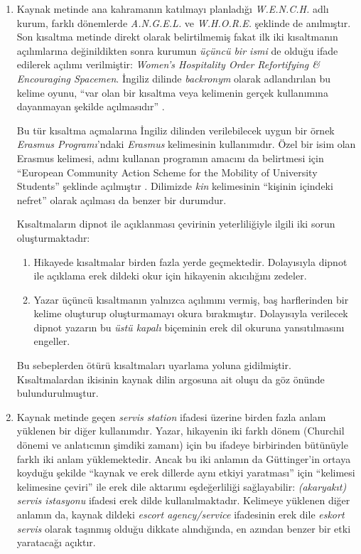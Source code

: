\begin{enumerate}
  \item
    Kaynak metinde ana kahramanın katılmayı planladığı \emph{W.E.N.C.H.} adlı kurum,
    farklı dönemlerde \emph{A.N.G.E.L.} ve \emph{W.H.O.R.E.} şeklinde de anılmıştır.
    Son kısaltma metinde direkt olarak belirtilmemiş fakat ilk iki kısaltmanın
    açılımlarına değinildikten sonra kurumun \emph{üçüncü bir ismi} de olduğu ifade
    edilerek açılımı verilmiştir: \emph{Women's Hospitality Order Refortifying \&
    Encouraging Spacemen}. İngiliz dilinde \emph{backronym} olarak adlandırılan bu
    kelime oyunu, ``var olan bir kısaltma veya kelimenin gerçek kullanımına
    dayanmayan şekilde açılmasıdır'' \citep{OxfordBackronym}.

    Bu tür kısaltma açmalarına İngiliz dilinden verilebilecek uygun bir örnek
    \emph{Erasmus Programı}'ndaki \emph{Erasmus} kelimesinin kullanımıdır. Özel bir
    isim olan Erasmus kelimesi, adını kullanan programın amacını da belirtmesi için
    ``European Community Action Scheme for the Mobility of University Students''
    şeklinde açılmıştır \citep{WkErasmus}. Dilimizde \emph{kin} kelimesinin
    ``kişinin içindeki nefret'' \citep{SesliBackronym} olarak açılması da benzer bir
    durumdur.

    Kısaltmaların dipnot ile açıklanması çevirinin yeterliliğiyle ilgili iki
    sorun oluşturmaktadır:

    \begin{enumerate}
      \item
        Hikayede kısaltmalar birden fazla yerde geçmektedir. Dolayısıyla dipnot ile
        açıklama erek dildeki okur için hikayenin akıcılığını zedeler.
      \item
        Yazar üçüncü kısaltmanın yalnızca açılımını vermiş, baş harflerinden bir
        kelime oluşturup oluşturmamayı okura bırakmıştır. Dolayısıyla verilecek
        dipnot yazarın bu \emph{üstü kapalı} biçeminin erek dil okuruna
        yansıtılmasını engeller.
    \end{enumerate}

    Bu sebeplerden ötürü kısaltmaları uyarlama yoluna gidilmiştir. Kısaltmalardan
    ikisinin kaynak dilin argosuna ait oluşu da göz önünde bulundurulmuştur.
  \item
    Kaynak metinde geçen \emph{servis station} ifadesi üzerine birden fazla
    anlam yüklenen bir diğer kullanımdır. Yazar, hikayenin iki farklı dönem
    (Churchil dönemi ve anlatıcının şimdiki zamanı) için bu ifadeye birbirinden
    bütünüyle farklı iki anlam yüklemektedir. Ancak bu iki anlamın da
    Güttinger'in ortaya koyduğu şekilde ``kaynak ve erek dillerde aynı etkiyi
    yaratması'' \citep{GokturkEsdeger} için ``kelimesi kelimesine çeviri''
    \citep{NewmarkTextbook} ile erek dile aktarımı eşdeğerliliği sağlayabilir:
    \emph{(akaryakıt) servis istasyonu} ifadesi erek dilde kullanılmaktadır.
    Kelimeye yüklenen diğer anlamın da, kaynak dildeki \emph{escort
    agency/service} ifadesinin erek dile \emph{eskort servis} olarak taşınmış
    olduğu dikkate alındığında, en azından benzer bir etki yaratacağı açıktır.
\end{enumerate}

